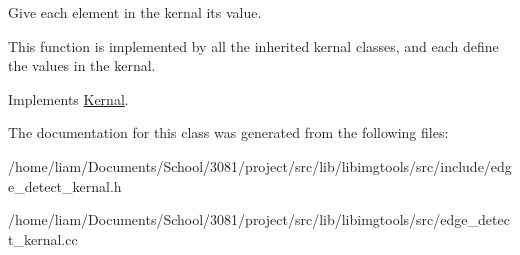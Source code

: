 Give each element in the kernal it\textquotesingle{}s value. 

This function is implemented by all the inherited kernal classes, and each define the values in the kernal. 

Implements \hyperlink{classKernal_a487ef0e4a0d37cb827b5c46750330952}{Kernal}.



The documentation for this class was generated from the following files\+:\begin{DoxyCompactItemize}
\item 
/home/liam/\+Documents/\+School/3081/project/src/lib/libimgtools/src/include/edge\+\_\+detect\+\_\+kernal.\+h\item 
/home/liam/\+Documents/\+School/3081/project/src/lib/libimgtools/src/edge\+\_\+detect\+\_\+kernal.\+cc\end{DoxyCompactItemize}
